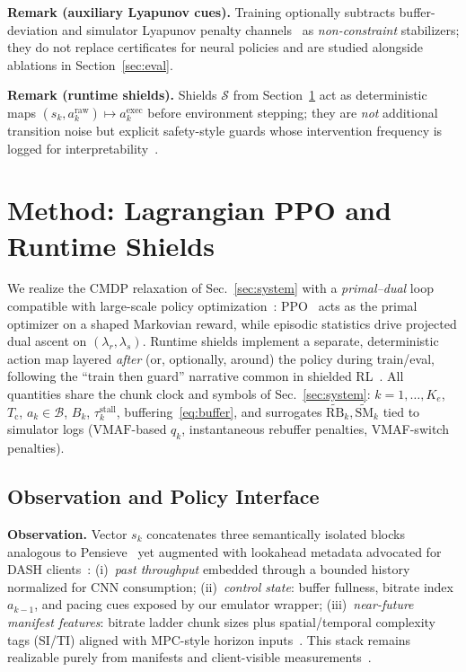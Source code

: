 \documentclass[preprint,12pt]{elsarticle}
\begin{document}
\textbf{Remark (auxiliary Lyapunov cues).}
Training optionally subtracts buffer-deviation and simulator Lyapunov penalty channels~\cite{neely2010stochastic} as \emph{non-constraint} stabilizers; they do not replace certificates for neural policies and are studied alongside ablations in Section~\ref{sec:eval}.

\textbf{Remark (runtime shields).}
Shields \(\mathcal{S}\) from Section~\ref{sec:method} act as deterministic maps \((s_k,a^{\mathrm{raw}}_k)\mapsto a^{\mathrm{exec}}_k\) before environment stepping; they are \emph{not} additional transition noise but explicit safety-style guards whose intervention frequency is logged for interpretability~\cite{alshiekh2018shielding}.

\section{Method: Lagrangian PPO and Runtime Shields}
\label{sec:method}

We realize the CMDP relaxation of Sec.~\ref{sec:system} with a \emph{primal--dual} loop compatible with large-scale policy optimization~\cite{paternain2019dual,achiam2017constrained}: PPO~\cite{schulman2017proximal} acts as the primal optimizer on a shaped Markovian reward, while episodic statistics drive projected dual ascent on \((\lambda_r,\lambda_s)\).
Runtime shields implement a separate, deterministic action map layered \emph{after} (or, optionally, around) the policy during train/eval, following the ``train then guard'' narrative common in shielded RL~\cite{alshiekh2018shielding,tian2022towards}.
All quantities share the chunk clock and symbols of Sec.~\ref{sec:system}: \(k=1,\ldots,K_e\), \(T_{\mathrm{c}}\), \(a_k\in\mathcal{B}\), \(B_k\), \(\tau^{\mathrm{stall}}_k\), buffering~\eqref{eq:buffer}, and surrogates \(\widetilde{\mathrm{RB}}_k,\widetilde{\mathrm{SM}}_k\) tied to simulator logs (\(\mathrm{VMAF}\)-based \(q_k\), instantaneous rebuffer penalties, VMAF-switch penalties).

\subsection{Observation and Policy Interface}

\textbf{Observation.}
Vector \(s_k\) concatenates three semantically isolated blocks analogous to Pensieve~\cite{mao2017neural} yet augmented with lookahead metadata advocated for DASH clients~\cite{sodagar2011mpeg}:
(i)~\emph{past throughput} embedded through a bounded history normalized for CNN consumption;
(ii)~\emph{control state}: buffer fullness, bitrate index \(a_{k-1}\), and pacing cues exposed by our emulator wrapper;
(iii)~\emph{near-future manifest features}: bitrate ladder chunk sizes plus spatial/temporal complexity tags (SI/TI) aligned with MPC-style horizon inputs~\cite{yin2015control}.
This stack remains realizable purely from manifests and client-visible measurements~\cite{sodagar2011mpeg}.
\end{document}
